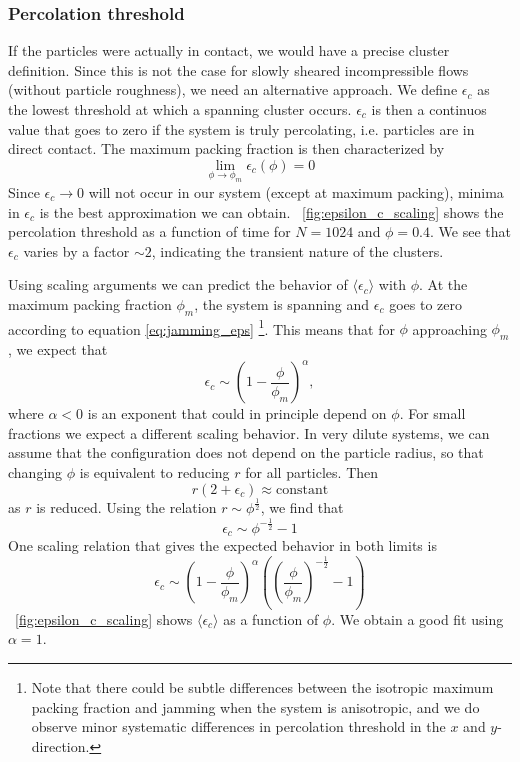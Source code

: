 \documentclass[aps,pre,twocolumn,letterpaper,floatfix,showpacs]{revtex4}
\begin{document}
\subsubsection{Percolation threshold}
If the particles were actually in contact, we would have a precise cluster definition. Since this is not the case for slowly sheared incompressible flows (without particle roughness), we need an alternative approach. We define $\epsilon_c$ as the lowest threshold at which a spanning cluster occurs. $\epsilon_c$ is then a continuos value that goes to zero if the system is truly percolating, i.e. particles are in direct contact. The maximum packing fraction is then characterized by
\begin{equation}
\lim_{\phi \rightarrow \phi_m} \epsilon_c(\phi) = 0
\label{eq:jamming_eps}
\end{equation}
Since $\epsilon_c \rightarrow 0$ will not occur in our system (except at maximum packing), minima in $\epsilon_c$ is the best approximation we can obtain. \figurename~\ref{fig:epsilon_c_scaling} shows the percolation threshold as a function of time for $N=1024$ and $\phi = 0.4$. We see that $\epsilon_c$ varies by a factor $\sim 2$, indicating the transient nature of the clusters. 

Using scaling arguments we can predict the behavior of $\langle \epsilon_c \rangle$ with $\phi$. At the maximum packing fraction $\phi_m$, the system is spanning and $\epsilon_c$ goes to zero according to equation \ref{eq:jamming_eps}
\footnote{Note that there could be subtle differences between the isotropic maximum packing fraction and jamming when the system is anisotropic, and we do observe minor systematic differences in percolation threshold in the $x$ and $y$-direction.}.
This means that for $\phi$ approaching $\phi_m$, we expect that
\begin{equation}
\epsilon_c \sim (1-\frac{\phi}{\phi_m})^\alpha,
\end{equation}
where $\alpha < 0$ is an exponent that could in principle depend on $\phi$. For small fractions we expect a different scaling behavior. In very dilute systems, we can assume that the configuration does not depend on the particle radius, so that changing $\phi$ is equivalent to reducing $r$ for all particles. Then
\begin{equation}
r(2+\epsilon_c) \approx \text{constant}
\end{equation}
as $r$ is reduced. Using the relation $r \sim \phi^\frac{1}{2}$, we find that 
\begin{equation}
\epsilon_c \sim \phi^{-\frac{1}{2}} - 1
\end{equation}
One scaling relation that gives the expected behavior in both limits is
\begin{equation}
\epsilon_c \sim (1-\frac{\phi}{\phi_m})^\alpha \left ((\frac{\phi}{\phi_m} )^{-\frac{1}{2}}-1 \right )
\end{equation}
\figurename~\ref{fig:epsilon_c_scaling} shows $\langle \epsilon_c \rangle$ as a function of $\phi$. We obtain a good fit using $\alpha = 1$.
\end{document}
